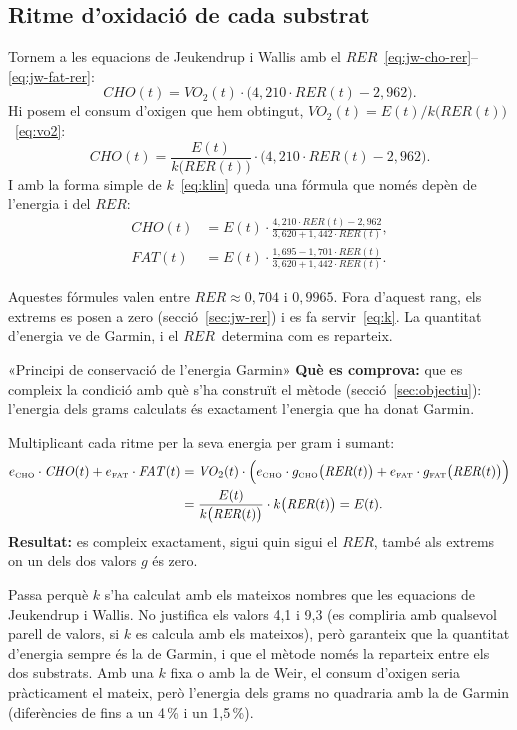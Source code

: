 \documentclass[10pt,a4paper]{article}
\newcommand{\sub}[1]{{\scriptscriptstyle\mathrm{#1}}}   %
\newcommand{\CHO}{\sub{CHO}}
\newcommand{\FAT}{\sub{FAT}}
\newcommand{\cho}{\ensuremath{\mathit{CHO}}}               %
\newcommand{\fat}{\ensuremath{\mathit{FAT}}}
\newcommand{\VO}{\ensuremath{\mathit{VO}_2}}               %
\newcommand{\RER}{\ensuremath{\mathit{RER}}}
\begin{document}
\subsection{Ritme d'oxidació de cada substrat}\label{sec:grams}
Tornem a les equacions de Jeukendrup i Wallis amb el
\RER~\eqref{eq:jw-cho-rer}--\eqref{eq:jw-fat-rer}:
\[
  \cho(t)=\VO(t)\cdot\bigl(4{,}210\cdot\RER(t)-2{,}962\bigr).
\]
Hi posem el consum d'oxigen que hem obtingut, $\VO(t)=E(t)/k\bigl(\RER(t)\bigr)$~\eqref{eq:vo2}:
\[
  \cho(t)=\frac{E(t)}{k\bigl(\RER(t)\bigr)}\cdot\bigl(4{,}210\cdot\RER(t)-2{,}962\bigr).
\]
I amb la forma simple de $k$~\eqref{eq:klin} queda una fórmula que només depèn de l'energia
i del \RER:
\begin{align}
  \cho(t) &= E(t)\cdot\frac{4{,}210\cdot\RER(t)-2{,}962}{3{,}620+1{,}442\cdot\RER(t)}, \label{eq:cho-final}\\[4pt]
  \fat(t) &= E(t)\cdot\frac{1{,}695-1{,}701\cdot\RER(t)}{3{,}620+1{,}442\cdot\RER(t)}. \label{eq:fat-final}
\end{align}

Aquestes fórmules valen entre $\RER\approx0{,}704$ i $0{,}9965$. Fora d'aquest rang, els
extrems es posen a zero (secció~\ref{sec:jw-rer}) i es fa servir~\eqref{eq:k}. La quantitat
d'energia ve de Garmin, i el \RER\ determina com es reparteix.

\begin{requadre}{«Principi de conservació de l'energia Garmin»}
\textbf{Què es comprova:} que es compleix la condició amb què s'ha construït el mètode
(secció~\ref{sec:objectiu}): l'energia dels grams calculats és exactament l'energia que ha
donat Garmin.

\smallskip
Multiplicant cada ritme per la seva energia per gram i sumant:
\begin{equation}
\begin{aligned}
  e_{\CHO}\cdot\cho(t)+e_{\FAT}\cdot\fat(t)
  &=\VO(t)\cdot\Bigl(e_{\CHO}\cdot g_{\CHO}\bigl(\RER(t)\bigr)+e_{\FAT}\cdot g_{\FAT}\bigl(\RER(t)\bigr)\Bigr)\\
  &=\frac{E(t)}{k\bigl(\RER(t)\bigr)}\cdot k\bigl(\RER(t)\bigr)=E(t) .
\end{aligned}
  \label{eq:conservacio}
\end{equation}
\textbf{Resultat:} es compleix exactament, sigui quin sigui el \RER, també als extrems on
un dels dos valors $g$ és zero.

\smallskip
Passa perquè $k$ s'ha calculat amb els mateixos nombres que les equacions de Jeukendrup i
Wallis. No justifica els valors 4,1 i 9,3 (es compliria amb qualsevol parell de valors, si
$k$ es calcula amb els mateixos), però garanteix que la quantitat d'energia sempre és la de
Garmin, i que el mètode només la reparteix entre els dos substrats. Amb una $k$ fixa o
amb la de Weir, el consum d'oxigen seria pràcticament el mateix, però l'energia dels grams
no quadraria amb la de Garmin (diferències de fins a un 4\,\% i un 1,5\,\%).
\end{requadre}
\end{document}
